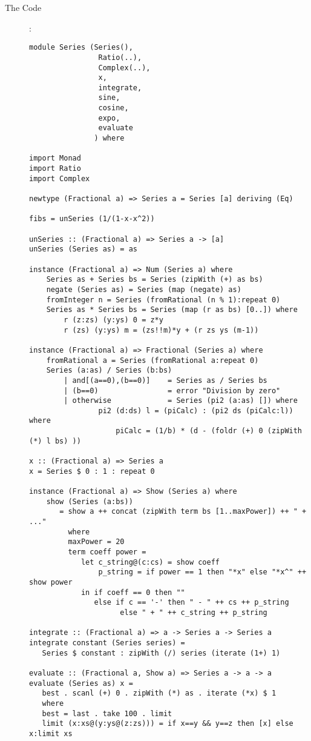 \documentclass[12pt]{report}
\begin{document}
\begin{description}
\item[The Code]:\\
\begin{verbatim}
module Series (Series(),
                Ratio(..),
                Complex(..),
                x,
                integrate,
                sine,
                cosine,
                expo,
                evaluate
               ) where
               
import Monad
import Ratio
import Complex

newtype (Fractional a) => Series a = Series [a] deriving (Eq)

fibs = unSeries (1/(1-x-x^2))

unSeries :: (Fractional a) => Series a -> [a]
unSeries (Series as) = as

instance (Fractional a) => Num (Series a) where
    Series as + Series bs = Series (zipWith (+) as bs)
    negate (Series as) = Series (map (negate) as)
    fromInteger n = Series (fromRational (n % 1):repeat 0)
    Series as * Series bs = Series (map (r as bs) [0..]) where
        r (z:zs) (y:ys) 0 = z*y
        r (zs) (y:ys) m = (zs!!m)*y + (r zs ys (m-1))

instance (Fractional a) => Fractional (Series a) where
    fromRational a = Series (fromRational a:repeat 0)
    Series (a:as) / Series (b:bs)
        | and[(a==0),(b==0)]    = Series as / Series bs
        | (b==0)                = error "Division by zero"
        | otherwise             = Series (pi2 (a:as) []) where
                pi2 (d:ds) l = (piCalc) : (pi2 ds (piCalc:l)) where
                    piCalc = (1/b) * (d - (foldr (+) 0 (zipWith (*) l bs) ))

x :: (Fractional a) => Series a
x = Series $ 0 : 1 : repeat 0

instance (Fractional a) => Show (Series a) where
    show (Series (a:bs))
       = show a ++ concat (zipWith term bs [1..maxPower]) ++ " + ..."
         where
         maxPower = 20
         term coeff power =
            let c_string@(c:cs) = show coeff
                p_string = if power == 1 then "*x" else "*x^" ++ show power
            in if coeff == 0 then ""
               else if c == '-' then " - " ++ cs ++ p_string
                     else " + " ++ c_string ++ p_string

integrate :: (Fractional a) => a -> Series a -> Series a
integrate constant (Series series) =
   Series $ constant : zipWith (/) series (iterate (1+) 1)

evaluate :: (Fractional a, Show a) => Series a -> a -> a
evaluate (Series as) x =
   best . scanl (+) 0 . zipWith (*) as . iterate (*x) $ 1
   where
   best = last . take 100 . limit
   limit (x:xs@(y:ys@(z:zs))) = if x==y && y==z then [x] else x:limit xs


\end{verbatim}
\end{description}
\end{document}
